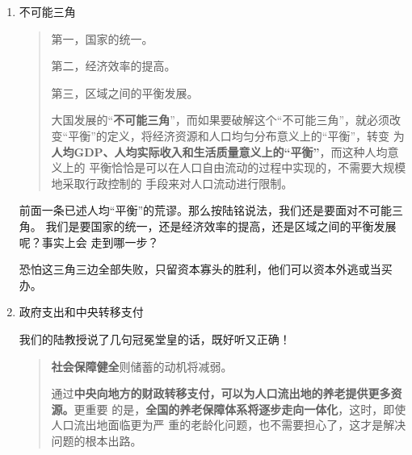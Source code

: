 \begin{enumerate}
  也可以参考美国经济创新集团（The Economic Innovation Group）发布的困境社区指数
  （DCI，the Distressed Communities Index，见\cref{fig:DCIbyD}）\footnote{对困境社区指
    数DCI的中文介绍可见澎湃 《美国社区评价：困境社区指数和繁荣城区体系》。}。

  \begin{quotation}
    但是，城市化和地区之间的自由移民是一个\textbf{几十年甚至上百年的过程}，在这个过程
    中，如果我们只看\textbf{特定时段的局部地区}，就可能会觉得，劳动力流动并没有带来地区
    间收入水平差距的缩小。
  \end{quotation}
  陆铭倒是知道均衡需要长期（实际上根本不可能均衡）。可在几十年甚至上百年的区
  域失衡中，中国中央和地方、地方和地方、政府和人民的矛盾恐怕早已内爆了。

\item 不可能三角

  \begin{quotation}

    第一，国家的统一。

    第二，经济效率的提高。

    第三，区域之间的平衡发展。

    大国发展的“\textbf{不可能三角}”，而如果要破解这个“不可能三角”，就必须改
    变“平衡”的定义，将经济资源和人口均匀分布意义上的“平衡”，转变
    为\textbf{人均GDP、人均实际收入和生活质量意义上的“平衡”}，而这种人均意义上的
    平衡恰恰是可以在人口自由流动的过程中实现的，不需要大规模地采取行政控制的
    手段来对人口流动进行限制。
  \end{quotation}

  前面一条已述人均“平衡”的荒谬。那么按陆铭说法，我们还是要面对不可能三角。
  我们是要国家的统一，还是经济效率的提高，还是区域之间的平衡发展呢？事实上会
  走到哪一步？

  恐怕这三角三边全部失败，只留资本寡头的胜利，他们可以资本外逃或当买办。

\item 政府支出和中央转移支付

  我们的陆教授说了几句冠冕堂皇的话，既好听又正确！

  \begin{quotation}
    \textbf{社会保障健全}则储蓄的动机将减弱。

    通过\textbf{中央向地方的财政转移支付，可以为人口流出地的养老提供更多资源。}更重要
    的是，\textbf{全国的养老保障体系将逐步走向一体化}，这时，即使人口流出地面临更为严
    重的老龄化问题，也不需要担心了，这才是解决问题的根本出路。


\end{quotation}
\end{enumerate}
